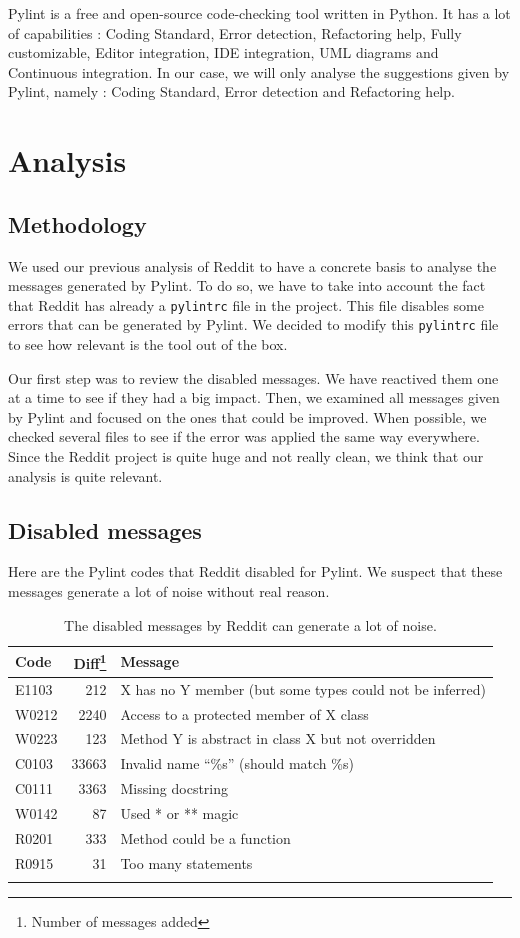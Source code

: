 \documentclass[12pt, a4paper]{article}
\newcommand{\pyl}{\textsf{Pylint}}
\begin{document}
\pyl{} is a free and open-source code-checking tool written in Python.
It has a lot of capabilities : Coding Standard, Error detection, Refactoring help, Fully customizable, Editor integration, IDE integration, UML diagrams and Continuous integration.
In our case, we will only analyse the suggestions given by \pyl{}, namely : Coding Standard, Error detection and Refactoring help.

\bigskip
\section*{Analysis}
\smallskip
\subsection*{Methodology}

We used our previous analysis of Reddit to have a concrete basis to analyse the messages generated by \pyl{}.
To do so, we have to take into account the fact that Reddit has already a \texttt{pylintrc} file in the project.
This file disables some errors that can be generated by \pyl{}.
We decided to modify this \texttt{pylintrc} file to see how relevant is the tool out of the box.

\medskip
Our first step was to review the disabled messages.
We have reactived them one at a time to see if they had a big impact.
Then, we examined all messages given by \pyl{} and focused on the ones that could be improved.
When possible, we checked several files to see if the error was applied the same way everywhere.
Since the Reddit project is quite huge and not really clean, we think that our analysis is quite relevant.
\newpage
\subsection*{Disabled messages}
Here are the \pyl{} codes that Reddit disabled for \pyl{}. 
We suspect that these messages generate a lot of noise without real reason. \\

\begin{longtable}{|l|r|m{9cm}|}
\hline
\textbf{\small{Code}} & \textbf{\small{Diff\footnote{Number of messages added}}} & \textbf{\small{Message}} \\
\hline
\hline
E1103 & 212 & X has no Y member (but some types could not be inferred) \\
\hline
W0212 & 2240  & Access to a protected member of X class \\
\hline
W0223 & 123 & Method Y is abstract in class X but not overridden \\
\hline
C0103 & 33663 & Invalid name ``\%s'' (should match \%s) \\
\hline
C0111 & 3363 & Missing docstring \\
\hline
W0142 & 87 & Used * or ** magic \\
\hline
R0201 & 333 & Method could be a function \\
\hline
R0915 & 31 & Too many statements \\
\hline
\caption{\label{messages} The disabled messages by Reddit can generate a lot of noise. }
\end{longtable}
\end{document}
